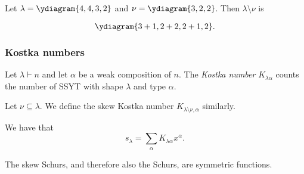 \documentclass{article}
\begin{document}
\begin{example}
    Let $\lambda = \ydiagram{4,4,3,2}$ and $\nu = \ydiagram{3,2,2}$. Then $\lambda \setminus \nu$ is

    \[\ydiagram{3+1,2+2,2+1,2}.\]
\end{example}

\subsubsection{Kostka numbers}

\begin{definition}
    Let $\lambda \vdash n$ and let $\alpha$ be a weak composition of $n$. The \textit{Kostka number } $K_{\lambda\alpha}$ counts the number of SSYT with shape $\lambda$ and type $\alpha$.

    Let $\nu \subseteq \lambda$. We define the skew Kostka number $K_{\lambda\setminus\nu,\alpha}$ similarly.
\end{definition}

\begin{remark}
    We have that
    \[
        s_\lambda = \sum_\alpha K_{\lambda\alpha}x^\alpha.
    \]
\end{remark}

\begin{theorem} The skew Schurs, and therefore also the Schurs, are symmetric functions.
\end{theorem}
\end{document}
